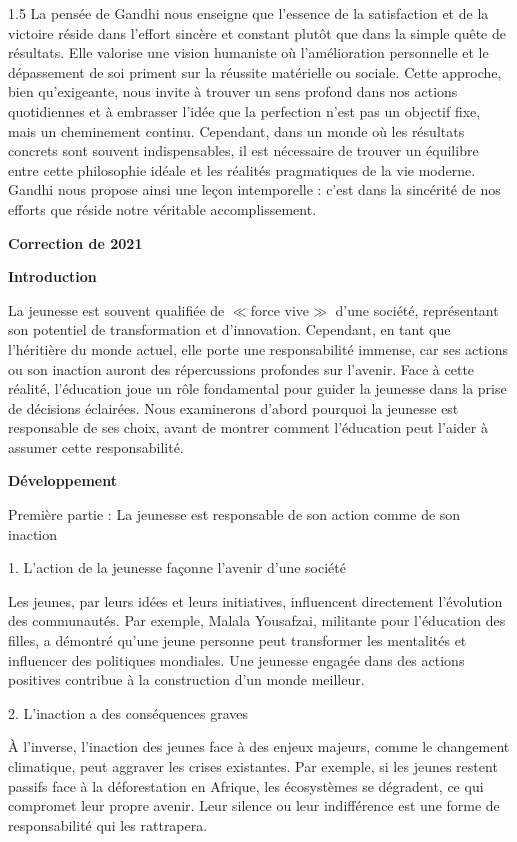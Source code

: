 \documentclass[12pt]{article}
\begin{document}
\begin{spacing}{1.5}
La pensée de Gandhi nous enseigne que l'essence de la satisfaction et de la victoire réside dans l'effort sincère et constant plutôt que dans la simple quête de résultats. Elle valorise une vision humaniste où l'amélioration personnelle et le dépassement de soi priment sur la réussite matérielle ou sociale. Cette approche, bien qu'exigeante, nous invite à trouver un sens profond dans nos actions quotidiennes et à embrasser l'idée que la perfection n'est pas un objectif fixe, mais un cheminement continu. Cependant, dans un monde où les résultats concrets sont souvent indispensables, il est nécessaire de trouver un équilibre entre cette philosophie idéale et les réalités pragmatiques de la vie moderne. Gandhi nous propose ainsi une leçon intemporelle : c'est dans la sincérité de nos efforts que réside notre véritable accomplissement.

\quad
\quad

\textbf{Correction de 2021}

\textbf{Introduction}

La jeunesse est souvent qualifiée de $\ll$force  vive$\gg$ d'une société, représentant son potentiel de transformation et d'innovation. Cependant, en tant que l'héritière du monde actuel, elle porte une responsabilité immense, car ses actions ou son inaction auront des répercussions profondes sur l'avenir. Face à cette réalité, l'éducation joue un rôle fondamental pour guider la jeunesse dans la prise de décisions éclairées. Nous examinerons d'abord pourquoi la jeunesse est responsable de ses choix, avant de montrer comment l'éducation peut l'aider à assumer cette responsabilité.


\textbf{Développement}

Première partie : La jeunesse est responsable de son action comme de son inaction

1. L'action de la jeunesse façonne l'avenir d'une société
  
Les jeunes, par leurs idées et leurs initiatives, influencent directement l'évolution des communautés. Par exemple, Malala Yousafzai, militante pour l'éducation des filles, a démontré qu'une jeune personne peut transformer les mentalités et influencer des politiques mondiales. Une jeunesse engagée dans des actions positives contribue à la construction d'un monde meilleur.

2. L'inaction a des conséquences graves  

À l'inverse, l'inaction des jeunes face à des enjeux majeurs, comme le changement climatique, peut aggraver les crises existantes. Par exemple, si les jeunes restent passifs face à la déforestation en Afrique, les écosystèmes se dégradent, ce qui compromet leur propre avenir. Leur silence ou leur indifférence est une forme de responsabilité qui les rattrapera.


\end{spacing}
\end{document}
